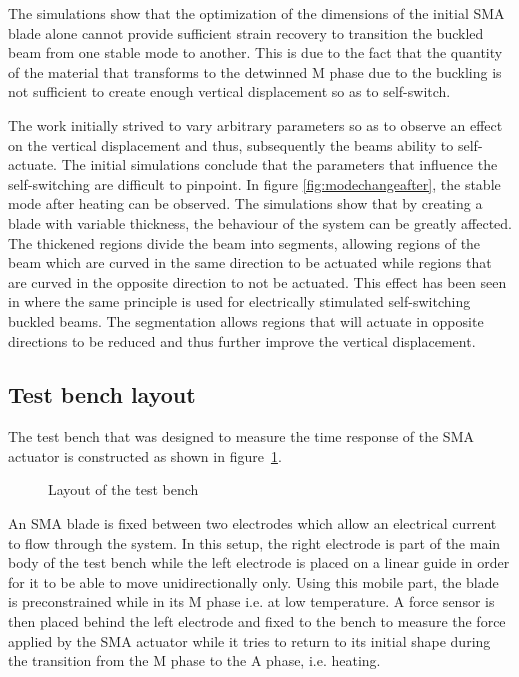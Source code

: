 The simulations show that the optimization of the dimensions of the initial SMA blade alone cannot provide sufficient strain recovery to transition the buckled beam from one stable mode to another. This is due to the fact that the quantity of the material that transforms to the detwinned M phase due to the buckling is not sufficient to create enough vertical displacement so as to self-switch.

The work initially strived to vary arbitrary parameters so as to observe an effect on the vertical displacement and thus, subsequently the beams ability to self-actuate. The initial simulations conclude that the parameters that influence the self-switching are difficult to pinpoint. In figure \ref{fig:modechangeafter}, the stable mode after heating can be observed. The simulations show that by creating a blade with variable thickness, the behaviour of the system can be greatly affected. The thickened regions divide the beam into segments, allowing regions of the beam which are curved in the same direction to be actuated while regions that are curved in the opposite direction to not be actuated. This effect has been seen in \cite{rossiter_self-switching_2006} where the same principle is used for electrically stimulated self-switching buckled beams. The segmentation allows regions that will actuate in opposite directions to be reduced and thus further improve the vertical displacement.

\subsection{Test bench layout}
The test bench that was designed to measure the time response of the SMA actuator is constructed as shown in figure~\ref{fig:test_bench}.
\begin{figure}[H]
	\centering
	\def\svgwidth{0.5\columnwidth}
	
	\caption{Layout of the test bench}
	\label{fig:test_bench}
\end{figure}

An SMA blade is fixed between two electrodes which allow an electrical current to flow through the system. In this setup, the right electrode is part of the main body of the test bench while the left electrode is placed on a linear guide in order for it to be able to move unidirectionally only. Using this mobile part, the blade is preconstrained while in its M phase i.e. at low temperature. A force sensor is then placed behind the left electrode and fixed to the bench to measure the force applied by the SMA actuator while it tries to return to its initial shape during the transition from the M phase to the A phase, i.e. heating.


